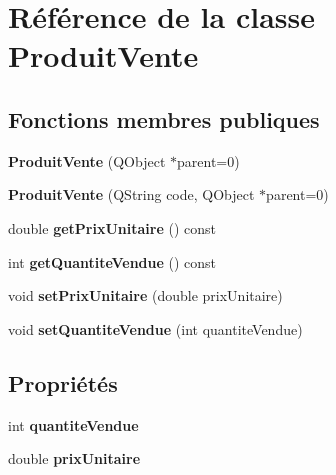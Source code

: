 \hypertarget{class_produit_vente}{
\section{Référence de la classe ProduitVente}
\label{de/da9/class_produit_vente}
}
\subsection*{Fonctions membres publiques}
\begin{DoxyCompactItemize}
\item 
\hypertarget{class_produit_vente_ae00ba963c49b84270e333143f60c95e3}{
{\bfseries ProduitVente} (QObject $\ast$parent=0)}
\label{de/da9/class_produit_vente_ae00ba963c49b84270e333143f60c95e3}

\item 
\hypertarget{class_produit_vente_afb2bfa47829419e0401f0cddbcd12163}{
{\bfseries ProduitVente} (QString code, QObject $\ast$parent=0)}
\label{de/da9/class_produit_vente_afb2bfa47829419e0401f0cddbcd12163}

\item 
\hypertarget{class_produit_vente_a552ea383ed75bf1e7d9da4602320850d}{
double {\bfseries getPrixUnitaire} () const }
\label{de/da9/class_produit_vente_a552ea383ed75bf1e7d9da4602320850d}

\item 
\hypertarget{class_produit_vente_a588f1f05e08c421ab0da6de943202768}{
int {\bfseries getQuantiteVendue} () const }
\label{de/da9/class_produit_vente_a588f1f05e08c421ab0da6de943202768}

\item 
\hypertarget{class_produit_vente_a9fa039eab6b9c6a3142bb8119a876349}{
void {\bfseries setPrixUnitaire} (double prixUnitaire)}
\label{de/da9/class_produit_vente_a9fa039eab6b9c6a3142bb8119a876349}

\item 
\hypertarget{class_produit_vente_a936ee8f739cac9736d78fdd6a2c969c4}{
void {\bfseries setQuantiteVendue} (int quantiteVendue)}
\label{de/da9/class_produit_vente_a936ee8f739cac9736d78fdd6a2c969c4}

\end{DoxyCompactItemize}
\subsection*{Propriétés}
\begin{DoxyCompactItemize}
\item 
\hypertarget{class_produit_vente_ad3d08eebb0f3b1b468025792c8845a7e}{
int {\bfseries quantiteVendue}}
\label{de/da9/class_produit_vente_ad3d08eebb0f3b1b468025792c8845a7e}

\item 
\hypertarget{class_produit_vente_af018cdfe3b341b1df8f9eefddedb113d}{
double {\bfseries prixUnitaire}}
\label{de/da9/class_produit_vente_af018cdfe3b341b1df8f9eefddedb113d}

\end{DoxyCompactItemize}


